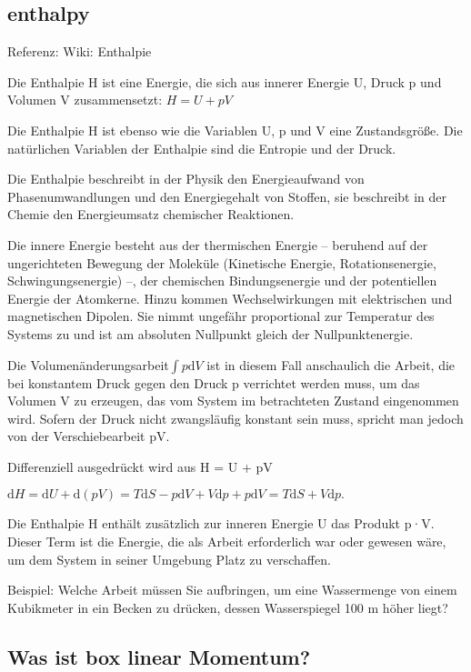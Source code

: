 \documentclass[]{article}
\begin{document}
\subsection*{enthalpy}
Referenz: Wiki: Enthalpie

Die Enthalpie H  ist eine Energie, die sich aus innerer Energie U, Druck p und Volumen V zusammensetzt:
$H = U + pV$

Die Enthalpie H ist ebenso wie die Variablen U, p und V eine Zustandsgröße. Die natürlichen Variablen der Enthalpie sind die Entropie und der Druck.

Die Enthalpie beschreibt in der Physik  den Energieaufwand von Phasenumwandlungen und den Energiegehalt von Stoffen, sie beschreibt in der Chemie den Energieumsatz chemischer Reaktionen.

Die innere Energie besteht aus der thermischen Energie – beruhend auf der ungerichteten Bewegung der Moleküle (Kinetische Energie, Rotationsenergie, Schwingungsenergie) –, der chemischen Bindungsenergie und der potentiellen Energie der Atomkerne. Hinzu kommen Wechselwirkungen mit elektrischen und magnetischen Dipolen. Sie nimmt ungefähr proportional zur Temperatur des Systems zu und ist am absoluten Nullpunkt gleich der Nullpunktenergie.

Die Volumenänderungsarbeit$ \int{p \mathrm dV}$ ist in diesem Fall anschaulich die Arbeit, die bei konstantem Druck gegen den Druck p verrichtet werden muss, um das Volumen V zu erzeugen, das vom System im betrachteten Zustand eingenommen wird. Sofern der Druck nicht zwangsläufig konstant sein muss, spricht man jedoch von der Verschiebearbeit pV.

Differenziell ausgedrückt wird aus H = U + pV

$\mathrm dH = \mathrm dU + \mathrm d(pV) = T \mathrm dS - p \mathrm dV + V \mathrm dp + p \mathrm dV = T\mathrm dS + V \mathrm dp. $

Die Enthalpie H enthält zusätzlich zur inneren Energie U das Produkt p·V. Dieser Term ist die Energie, die als Arbeit erforderlich war oder gewesen wäre, um dem System in seiner Umgebung Platz zu verschaffen.

Beispiel: Welche Arbeit müssen Sie aufbringen, um eine Wassermenge von einem Kubikmeter in ein Becken zu drücken, dessen Wasserspiegel 100 m höher liegt?

\subsection*{Was ist box linear Momentum?}
\end{document}
